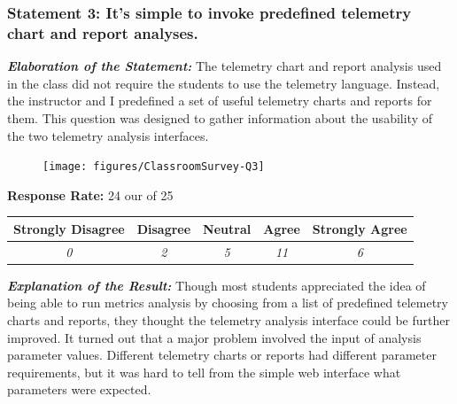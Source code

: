 

\clearpage
\subsubsection{Statement 3: It's simple to invoke predefined telemetry chart and report analyses.}

\textbf{\textit{Elaboration of the Statement:}}
The telemetry chart and report analysis used in the class did not require the students to use the telemetry language. Instead, the instructor and I predefined a set of useful telemetry charts and reports for them. This question was designed to gather information about the usability of the two telemetry analysis interfaces.

\begin{quote}\end{quote} %

\begin{figure}[h]
  \center
  \texttt{[image: figures/ClassroomSurvey-Q3]}
  \label{fig:InClassSurvey-Q3}
\end{figure}

\begin{center}\textbf{Response Rate:} 24 our of 25\end{center}
\begin{table}[h]
	\centering
		\begin{tabular}{|c|c|c|c|c|} 
			\hline
			\textbf{Strongly Disagree} & \textbf{Disagree} & \textbf{Neutral} & \textbf{Agree} & \textbf{Strongly Agree} \\
			\hline
			\textit{0} & \textit{2} & \textit{5} & \textit{11} &\textit{6} \\
			\hline
		\end{tabular}
	\label{table:InClassSurvey-Q3}
\end{table}

\textbf{\textit{Explanation of the Result:}}
Though most students appreciated the idea of being able to run metrics analysis by choosing from a list of predefined telemetry charts and reports, they thought the telemetry analysis interface could be further improved. It turned out that a major problem involved the input of analysis parameter values. Different telemetry charts or reports had different parameter requirements, but it was hard to tell from the simple web interface what parameters were expected.




